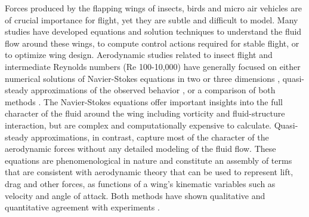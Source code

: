 \documentclass{article}
\begin{document}

Forces produced by the flapping wings of insects, birds and micro air vehicles
are of crucial importance for flight, yet they are subtle and difficult to
model.  Many studies have developed equations and solution techniques to
understand the fluid flow around these wings, to compute control actions
required for stable flight, or to optimize wing design. Aerodynamic studies
related to insect flight and intermediate Reynolds numbers (Re 100-10,000) have
generally focused on either numerical solutions of Navier-Stokes equations in
two or three dimensions \cite{wu2004unsteady,wang2000two}, quasi-steady
approximations of the observed behavior
\cite{sane2002aerodynamic,ellington1984aerodynamics}, or a comparison of both
methods \cite{pesavento2004falling}.  The Navier-Stokes equations offer
important insights into the full character of the fluid around the wing
including vorticity and fluid-structure interaction, but are complex and
computationally expensive to calculate.  Quasi-steady approximations, in
contrast, capture most of the character of the aerodynamic forces without any
detailed modeling of the fluid flow.  These equations are phenomenological in
nature and constitute an assembly of terms that are consistent with aerodynamic
theory that can be used to represent lift, drag and other forces, as functions
of a wing's kinematic variables such as velocity and angle of attack.  Both
methods have shown qualitative and quantitative agreement with experiments
\cite{wang2004unsteady}.

\end{document}
